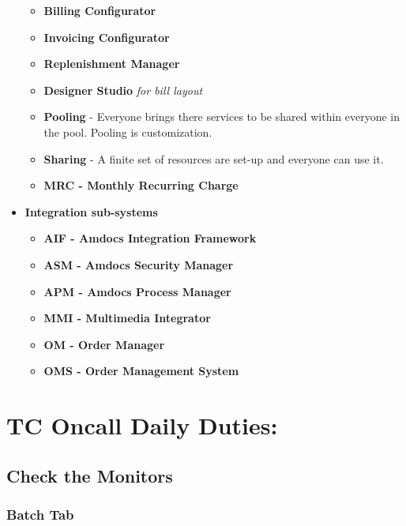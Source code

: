 \documentclass[12pt,twoside]{article}
\begin{document}
\begin{itemize}
\begin{itemize}
\item \textbf{Billing Configurator}
\item \textbf{Invoicing Configurator}
\item \textbf{Replenishment Manager}
\item \textbf{Designer Studio} \emph{for bill layout}
\item \textbf{Pooling} - Everyone brings there services to be shared within
     everyone in the pool. Pooling is customization.
\item \textbf{Sharing} - A finite set of resources are set-up and everyone can
     use it.
\item \textbf{MRC - Monthly Recurring Charge}
\end{itemize}
\item \textbf{Integration sub-systems}
\begin{itemize}
\item \textbf{AIF - Amdocs Integration Framework}
\item \textbf{ASM - Amdocs Security Manager}
\item \textbf{APM - Amdocs Process Manager}
\item \textbf{MMI - Multimedia Integrator}
\item \textbf{OM - Order Manager}
\item \textbf{OMS - Order Management System}
\end{itemize}
\end{itemize}
\newpage
\section{TC Oncall Daily Duties:}
\label{sec-4}
\subsection{Check the Monitors}
\label{sec-4-1}
\subsubsection{Batch Tab}
\label{sec-4-1-1}
\end{document}
